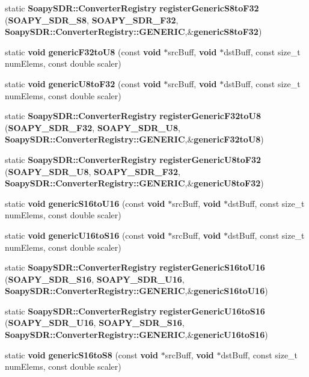 \begin{DoxyCompactItemize}
\item 
static {\bf Soapy\+S\+D\+R\+::\+Converter\+Registry} {\bf register\+Generic\+S8to\+F32} ({\bf S\+O\+A\+P\+Y\+\_\+\+S\+D\+R\+\_\+\+S8}, {\bf S\+O\+A\+P\+Y\+\_\+\+S\+D\+R\+\_\+\+F32}, {\bf Soapy\+S\+D\+R\+::\+Converter\+Registry\+::\+G\+E\+N\+E\+R\+IC},\&{\bf generic\+S8to\+F32})
\item 
static {\bf void} {\bf generic\+F32to\+U8} (const {\bf void} $\ast$src\+Buff, {\bf void} $\ast$dst\+Buff, const size\+\_\+t num\+Elems, const double scaler)
\item 
static {\bf void} {\bf generic\+U8to\+F32} (const {\bf void} $\ast$src\+Buff, {\bf void} $\ast$dst\+Buff, const size\+\_\+t num\+Elems, const double scaler)
\item 
static {\bf Soapy\+S\+D\+R\+::\+Converter\+Registry} {\bf register\+Generic\+F32to\+U8} ({\bf S\+O\+A\+P\+Y\+\_\+\+S\+D\+R\+\_\+\+F32}, {\bf S\+O\+A\+P\+Y\+\_\+\+S\+D\+R\+\_\+\+U8}, {\bf Soapy\+S\+D\+R\+::\+Converter\+Registry\+::\+G\+E\+N\+E\+R\+IC},\&{\bf generic\+F32to\+U8})
\item 
static {\bf Soapy\+S\+D\+R\+::\+Converter\+Registry} {\bf register\+Generic\+U8to\+F32} ({\bf S\+O\+A\+P\+Y\+\_\+\+S\+D\+R\+\_\+\+U8}, {\bf S\+O\+A\+P\+Y\+\_\+\+S\+D\+R\+\_\+\+F32}, {\bf Soapy\+S\+D\+R\+::\+Converter\+Registry\+::\+G\+E\+N\+E\+R\+IC},\&{\bf generic\+U8to\+F32})
\item 
static {\bf void} {\bf generic\+S16to\+U16} (const {\bf void} $\ast$src\+Buff, {\bf void} $\ast$dst\+Buff, const size\+\_\+t num\+Elems, const double scaler)
\item 
static {\bf void} {\bf generic\+U16to\+S16} (const {\bf void} $\ast$src\+Buff, {\bf void} $\ast$dst\+Buff, const size\+\_\+t num\+Elems, const double scaler)
\item 
static {\bf Soapy\+S\+D\+R\+::\+Converter\+Registry} {\bf register\+Generic\+S16to\+U16} ({\bf S\+O\+A\+P\+Y\+\_\+\+S\+D\+R\+\_\+\+S16}, {\bf S\+O\+A\+P\+Y\+\_\+\+S\+D\+R\+\_\+\+U16}, {\bf Soapy\+S\+D\+R\+::\+Converter\+Registry\+::\+G\+E\+N\+E\+R\+IC},\&{\bf generic\+S16to\+U16})
\item 
static {\bf Soapy\+S\+D\+R\+::\+Converter\+Registry} {\bf register\+Generic\+U16to\+S16} ({\bf S\+O\+A\+P\+Y\+\_\+\+S\+D\+R\+\_\+\+U16}, {\bf S\+O\+A\+P\+Y\+\_\+\+S\+D\+R\+\_\+\+S16}, {\bf Soapy\+S\+D\+R\+::\+Converter\+Registry\+::\+G\+E\+N\+E\+R\+IC},\&{\bf generic\+U16to\+S16})
\item 
static {\bf void} {\bf generic\+S16to\+S8} (const {\bf void} $\ast$src\+Buff, {\bf void} $\ast$dst\+Buff, const size\+\_\+t num\+Elems, const double scaler)

\end{DoxyCompactItemize}
